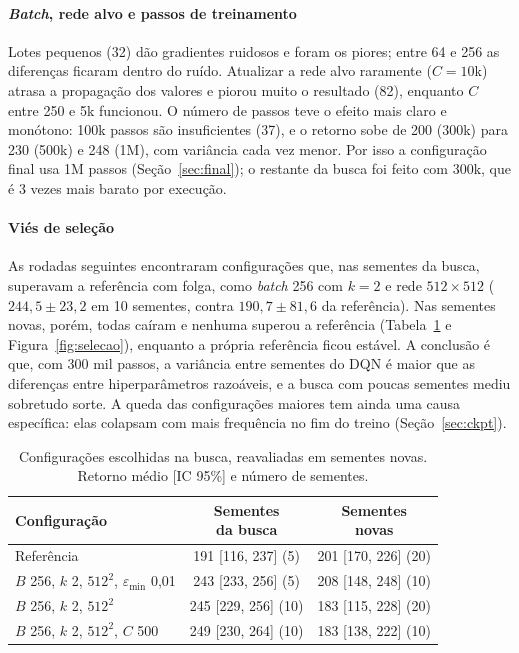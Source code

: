 \documentclass[conference]{IEEEtran}
\begin{document}
\paragraph{\textit{Batch}, rede alvo e passos de treinamento}
Lotes pequenos (32) dão gradientes ruidosos e foram os piores; entre 64 e 256 as diferenças ficaram dentro do ruído. Atualizar a rede alvo raramente ($C=10$k) atrasa a propagação dos valores e piorou muito o resultado (82), enquanto $C$ entre 250 e 5k funcionou. O número de passos teve o efeito mais claro e monótono: 100k passos são insuficientes (37), e o retorno sobe de 200 (300k) para 230 (500k) e 248 (1M), com variância cada vez menor. Por isso a configuração final usa 1M passos (Seção~\ref{sec:final}); o restante da busca foi feito com 300k, que é 3 vezes mais barato por execução.

\paragraph{Viés de seleção}
As rodadas seguintes encontraram configurações que, nas sementes da busca, superavam a referência com folga, como \textit{batch} 256 com $k=2$ e rede $512\times512$ ($244{,}5\pm23{,}2$ em 10 sementes, contra $190{,}7\pm81{,}6$ da referência). Nas sementes novas, porém, todas caíram e nenhuma superou a referência (Tabela~\ref{tab:selecao} e Figura~\ref{fig:selecao}), enquanto a própria referência ficou estável. A conclusão é que, com 300 mil passos, a variância entre sementes do DQN é maior que as diferenças entre hiperparâmetros razoáveis, e a busca com poucas sementes mediu sobretudo sorte. A queda das configurações maiores tem ainda uma causa específica: elas colapsam com mais frequência no fim do treino (Seção~\ref{sec:ckpt}).

\begin{table}[t]
\centering
\caption{Configurações escolhidas na busca, reavaliadas em sementes novas. Retorno médio [IC 95\%] e número de sementes.}
\label{tab:selecao}
\footnotesize
\setlength{\tabcolsep}{3pt}
\begin{tabularx}{\columnwidth}{@{}>{\raggedright\arraybackslash}Xcc@{}}
\toprule
Configuração & \makecell{Sementes\\da busca} & \makecell{Sementes\\novas} \\
\midrule
Referência & 191 [116, 237] (5) & 201 [170, 226] (20) \\
$B$ 256, $k$ 2, $512^2$, $\varepsilon_{\min}$ 0,01 & 243 [233, 256] (5) & 208 [148, 248] (10) \\
$B$ 256, $k$ 2, $512^2$ & 245 [229, 256] (10) & 183 [115, 228] (20) \\
$B$ 256, $k$ 2, $512^2$, $C$ 500 & 249 [230, 264] (10) & 183 [138, 222] (10) \\
\bottomrule
\end{tabularx}
\end{table}
\end{document}
